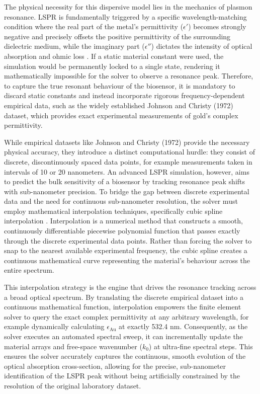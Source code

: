 \documentclass[class=report, crop=false]{standalone}
\begin{document}
The physical necessity for this dispersive model lies in the mechanics of plasmon resonance. LSPR is fundamentally triggered by a specific wavelength-matching condition where the real part of the metal's permittivity ($\epsilon'$) becomes strongly negative and precisely offsets the positive permittivity of the surrounding dielectric medium, while the imaginary part ($\epsilon''$) dictates the intensity of optical absorption and ohmic loss \citep{Das2023}. If a static material constant were used, the simulation would be permanently locked to a single state, rendering it mathematically impossible for the solver to observe a resonance peak. Therefore, to capture the true resonant behaviour of the biosensor, it is mandatory to discard static constants and instead incorporate rigorous frequency-dependent empirical data, such as the widely established Johnson and Christy (1972) dataset, which provides exact experimental measurements of gold's complex permittivity.

\vspace{12pt}

While empirical datasets like Johnson and Christy (1972) provide the necessary physical accuracy, they introduce a distinct computational hurdle: they consist of discrete, discontinuously spaced data points, for example measurements taken in intervals of 10 or 20 nanometers. An advanced LSPR simulation, however, aims to predict the bulk sensitivity of a biosensor by tracking resonance peak shifts with sub-nanometer precision. To bridge the gap between discrete experimental data and the need for continuous sub-nanometer resolution, the solver must employ mathematical interpolation techniques, specifically cubic spline interpolation \citep{PhysRevE.100.063305}. Interpolation is a numerical method that constructs a smooth, continuously differentiable piecewise polynomial function that passes exactly through the discrete experimental data points. Rather than forcing the solver to snap to the nearest available experimental frequency, the cubic spline creates a continuous mathematical curve representing the material's behaviour across the entire spectrum.

\vspace{12pt}

This interpolation strategy is the engine that drives the resonance tracking across a broad optical spectrum. By translating the discrete empirical dataset into a continuous mathematical function, interpolation empowers the finite element solver to query the exact complex permittivity at any arbitrary wavelength, for example dynamically calculating $\epsilon_{\text{Au}}$ at exactly 532.4 nm. Consequently, as the solver executes an automated spectral sweep, it can incrementally update the material arrays and free-space wavenumber ($k_0$) at ultra-fine spectral steps. This ensures the solver accurately captures the continuous, smooth evolution of the optical absorption cross-section, allowing for the precise, sub-nanometer identification of the LSPR peak without being artificially constrained by the resolution of the original laboratory dataset.
\end{document}
